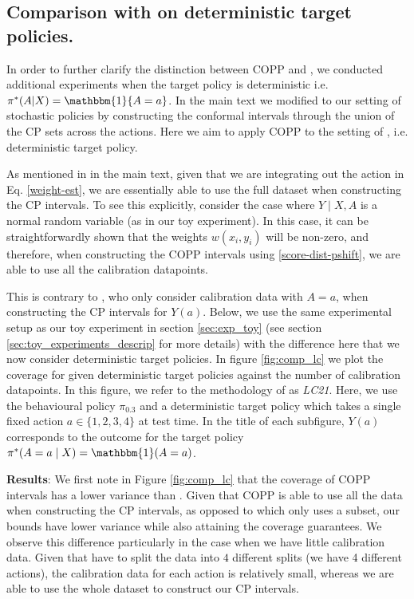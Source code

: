 \subsection{Comparison with \cite{lei2020conformal} on deterministic target policies.} \label{subsec:comp_lc}
In order to further clarify the distinction between COPP and \cite{lei2020conformal}, we conducted additional experiments when the target policy is deterministic i.e. $\pi^*(A|X) = \mathbbm{1}\{A=a\}$. In the main text we modified \cite{lei2020conformal} to our setting of stochastic policies by constructing the conformal intervals through the union of the CP sets across the actions. Here we aim to apply COPP to the setting of \cite{lei2020conformal}, i.e. deterministic target policy.

As mentioned in in the main text, given that we are integrating out the action in Eq. \ref{weight-est}, we are essentially able to use the full dataset when constructing the CP intervals. To see this explicitly, consider the case where $Y \mid X, A$ is a normal random variable (as in our toy experiment). In this case, it can be straightforwardly shown that the weights $w(x_i, y_i)$ will be non-zero, and therefore, when constructing the COPP intervals using \eqref{score-dist-pshift}, we are able to use all the calibration datapoints.

This is contrary to \cite{lei2020conformal}, who only consider calibration data with $A=a$, when constructing the CP intervals for $Y(a)$. Below, we use the same experimental setup as our toy experiment in section \ref{sec:exp_toy} (see section \ref{sec:toy_experiments_descrip} for more details) with the difference here that we now consider deterministic target policies. In figure \ref{fig:comp_lc} we plot the coverage for given deterministic target policies against the number of calibration datapoints. In this figure, we refer to the methodology of \cite{lei2020conformal} as \emph{LC21}. Here, we use the behavioural policy $\pi_{0.3}$ and a deterministic target policy which takes a single fixed action $a \in \{1, 2, 3, 4\}$ at test time. In the title of each subfigure, $Y(a)$ corresponds to the outcome for the target policy $\pi^*(A=a\mid X) = \mathbbm{1}(A=a)$.

\textbf{Results}: We first note in Figure \ref{fig:comp_lc} that the coverage of COPP intervals has a lower variance than \cite{lei2020conformal}. Given that COPP is able to use all the data when constructing the CP intervals, as opposed to \cite{lei2020conformal} which only uses a subset, our bounds have lower variance while also attaining the coverage guarantees. We observe this difference particularly in the case when we have little calibration data. Given that \cite{lei2020conformal} have to split the data into $4$ different splits (we have 4 different actions), the calibration data for each action is relatively small, whereas we are able to use the whole dataset to construct our CP intervals.


